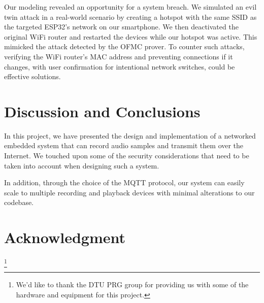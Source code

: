 \documentclass[conference]{IEEEtran}
\begin{document}
Our modeling revealed an opportunity for a system breach. We simulated an evil
twin attack in a real-world scenario by creating a hotspot with the same SSID
as the targeted ESP32's network on our smartphone. We then deactivated the
original WiFi router and restarted the devices while our hotspot was active.
This mimicked the attack detected by the OFMC prover. To counter such attacks,
verifying the WiFi router's MAC address and preventing connections if it
changes, with user confirmation for intentional network switches, could be
effective solutions.
     
\section{Discussion and Conclusions}
\label{sec:discussion_and_conclusions}

In this project, we have presented the design and implementation of a networked embedded system
that can record audio samples and transmit them over the Internet.
We touched upon some of the security considerations that need to be taken into account when designing such a system.


In addition, through the choice of the MQTT protocol, our system can easily scale to multiple recording and playback devices
with minimal alterations to our codebase.

\section*{Acknowledgment}

\thanks{We'd like to thank the DTU PRG group for providing us with some of the hardware and equipment for this project.}
\end{document}

